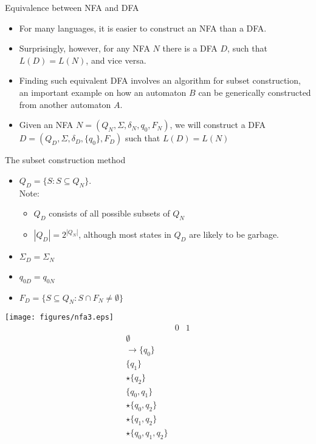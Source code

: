 \documentclass{prosper}%
\begin{document}
\begin{slide}{Equivalence between NFA and DFA}
\begin{itemize}
\item For many  languages,  it is easier to construct an NFA than a DFA.
\item Surprisingly, however, for any NFA $N$ there is a DFA $D$,
such that $L(D) = L(N)$, and vice versa.
\item  Finding such equivalent DFA  involves an {\blue algorithm for  subset construction}, an important example on how an automaton $B$ can be generically constructed from another automaton $A$.
\item Given an NFA \(N=(Q_N,\Sigma, \delta_N, q_0, F_N)\), we will construct a DFA \(D=(Q_D, \Sigma, \delta_D, \{q_0\}, F_D)\) such that $L(D)=L(N)$
\end{itemize}
\end{slide}

\begin{slide}{The subset construction method}
\begin{minipage}{6.5cm}
\begin{itemize}
\item $Q_D=\{S:S\subseteq Q_N\}$. \\
Note: \begin{itemize}
\item $Q_D$ consists of all possible subsets of $Q_N$
\item $|Q_D|=2^{|Q_N|}$, although most states in $Q_D$ are likely to be garbage.
\end{itemize}
\item $\Sigma_D=\Sigma_N$
\item $q_{0D} = q_{0N}$
\item $F_D=\{S\subseteq Q_N:S\cap F_N\neq \emptyset\}$
\end{itemize}
\end{minipage}
\begin{minipage}{4cm}
\texttt{[image: figures/nfa3.eps]}
\[
\begin{array}{r||l|l}
&0&1\\\hline\hline
\emptyset&&\\
\rightarrow\{q_0\}&&\\
\{q_1\}&&\\
\star\{q_2\}&&\\
\{q_0, q_1\}&&\\
\star\{q_0,q_2\}&&\\
\star\{q_1, q_2\}&&\\
\star\{q_0,q_1,q_2\}&&
\end{array}
\]
\end{minipage}
\end{slide}
\end{document}
